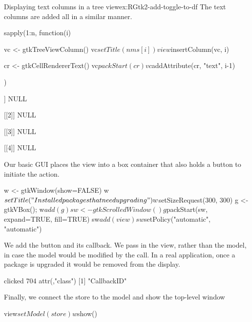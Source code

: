 \begin{example}{Displaying text columns in a tree view}{ex:RGtk2-add-toggle-to-df}
The text columns are added all in a similar manner.
\begin{Schunk}
\begin{Sinput}
 sapply(1:n, function(i) {
   vc <- gtkTreeViewColumn()
   vc$setTitle(nms[i])
   view$insertColumn(vc, i)
 
   cr <- gtkCellRendererText()
   vc$packStart(cr)
   vc$addAttribute(cr, "text", i-1)
 })
\end{Sinput}
\begin{Soutput}
[[1]]
NULL

[[2]]
NULL

[[3]]
NULL

[[4]]
NULL
\end{Soutput}
\end{Schunk}

Our basic GUI places the view into a box container that also holds a
button to initiate the action.
\begin{Schunk}
\begin{Sinput}
 w <- gtkWindow(show=FALSE)
 w$setTitle("Installed packages that need upgrading")
 w$setSizeRequest(300, 300)
 g <- gtkVBox(); w$add(g)
 sw <- gtkScrolledWindow()
 g$packStart(sw, expand=TRUE, fill=TRUE)
 sw$add(view)
 sw$setPolicy("automatic", "automatic")
\end{Sinput}
\end{Schunk}

We add the button and its callback. We pass in the view, rather than
the model, in case the model would be modified by the 
call. In a real application, once a package is upgraded it would be
removed from the display.
\begin{Schunk}
\begin{Soutput}
clicked 
    704 
attr(,"class")
[1] "CallbackID"
\end{Soutput}
\end{Schunk}

Finally, we connect the store to the model and show the top-level window
\begin{Schunk}
\begin{Sinput}
 view$setModel(store)
 w$show()
\end{Sinput}
\end{Schunk}
\end{example}

